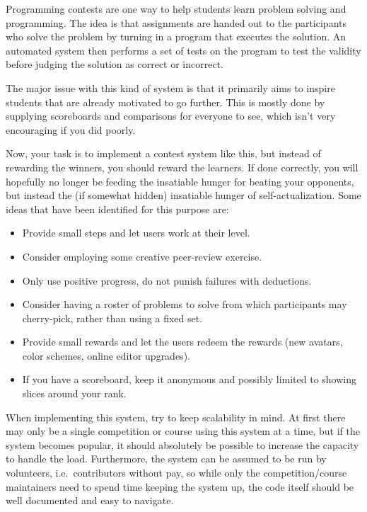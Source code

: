 \begin{refsection}
Programming contests are one way to help students learn problem solving and programming. The idea is that assignments are handed out to the participants who solve the problem by turning in a program that executes the solution. An automated system then performs a set of tests on the program to test the validity before judging the solution as correct or incorrect.

The major issue with this kind of system is that it primarily aims to inspire students that are already motivated to go further. This is mostly done by supplying scoreboards and comparisons for everyone to see, which isn't very encouraging if you did poorly.

Now, your task is to implement a contest system like this, but instead of rewarding the winners, you should reward the learners. If done correctly, you will hopefully no longer be feeding the insatiable hunger for beating your opponents, but instead the (if somewhat hidden) insatiable hunger of self-actualization. Some ideas that have been identified for this purpose are:
\begin{itemize}
    \item Provide small steps and let users work at their level.
    \item Consider employing some creative peer-review exercise.
    \item Only use positive progress, do not punish failures with deductions.
    \item Consider having a roster of problems to solve from which participants may cherry-pick, rather than using a fixed set.
    \item Provide small rewards and let the users redeem the rewards (new avatars, color schemes, online editor upgrades).
    \item If you have a scoreboard, keep it anonymous and possibly limited to showing slices around your rank. 
\end{itemize}

    When implementing this system, try to keep scalability in mind. At first there may only be a single competition or course using this system at a time, but if the system becomes popular, it should absolutely be possible to increase the capacity to handle the load. Furthermore, the system can be assumed to be run by volunteers, i.e.\ contributors without pay, so while only the competition/course maintainers need to spend time keeping the system up, the code itself should be well documented and easy to navigate.


\end{refsection}
